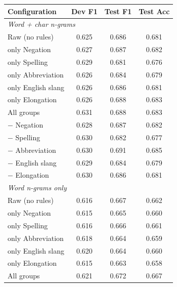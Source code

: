 \begin{tabular}{lccc}
\toprule
Configuration & Dev F1 & Test F1 & Test Acc\\
\midrule
\multicolumn{4}{l}{\emph{Word + char n-grams}}\\
Raw (no rules) & 0.625 & 0.686 & 0.681\\
\quad only Negation & 0.627 & 0.687 & 0.682\\
\quad only Spelling & 0.629 & 0.681 & 0.676\\
\quad only Abbreviation & 0.626 & 0.684 & 0.679\\
\quad only English slang & 0.626 & 0.686 & 0.681\\
\quad only Elongation & 0.626 & 0.688 & 0.683\\
All groups & 0.631 & 0.688 & 0.683\\
\quad $-$ Negation & 0.628 & 0.687 & 0.682\\
\quad $-$ Spelling & 0.630 & 0.682 & 0.677\\
\quad $-$ Abbreviation & 0.630 & 0.691 & 0.685\\
\quad $-$ English slang & 0.629 & 0.684 & 0.679\\
\quad $-$ Elongation & 0.630 & 0.686 & 0.681\\
\midrule
\multicolumn{4}{l}{\emph{Word n-grams only}}\\
Raw (no rules) & 0.616 & 0.667 & 0.662\\
\quad only Negation & 0.615 & 0.665 & 0.660\\
\quad only Spelling & 0.616 & 0.666 & 0.661\\
\quad only Abbreviation & 0.618 & 0.664 & 0.659\\
\quad only English slang & 0.620 & 0.664 & 0.660\\
\quad only Elongation & 0.615 & 0.663 & 0.658\\
All groups & 0.621 & 0.672 & 0.667\\
\bottomrule
\end{tabular}
